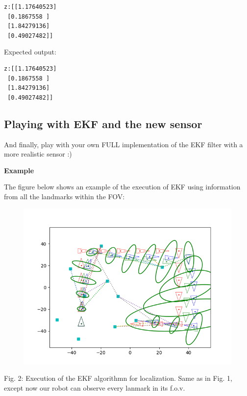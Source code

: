 \documentclass[11pt]{article}
\begin{document}
    \begin{Verbatim}[commandchars=\\\{\}]
z:[[1.17640523]
 [0.1867558 ]
 [1.84279136]
 [0.49027482]]
    \end{Verbatim}

    {Expected output:}

\begin{verbatim}
z:[[1.17640523]
 [0.1867558 ]
 [1.84279136]
 [0.49027482]]
\end{verbatim}

    \hypertarget{playing-with-ekf-and-the-new-sensor}{%
\subsection{Playing with EKF and the new
sensor}\label{playing-with-ekf-and-the-new-sensor}}

And finally, play with your own FULL implementation of the EKF filter
with a more realistic sensor :)

\textbf{Example}

The figure below shows an example of the execution of EKF using
information from all the landmarks within the FOV:

\begin{figure}
\centering
\includegraphics{images/fig5-2-2.png}
\end{figure}
Fig. 2: Execution of the EKF algorithmn for localization. Same as in
Fig. 1, except now our robot can observe every lanmark in its f.o.v.
\end{document}
